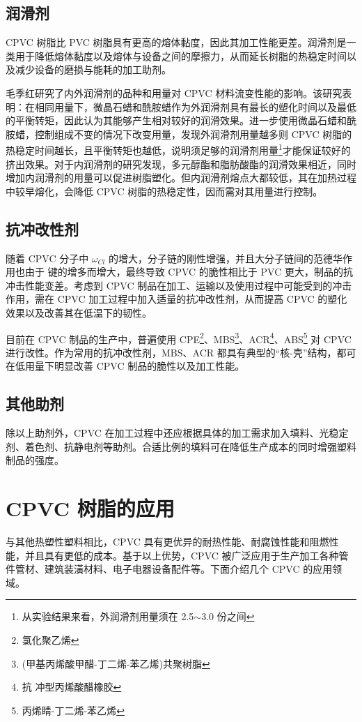 \subsection{润滑剂}
CPVC 树脂比 PVC 树脂具有更高的熔体黏度，因此其加工性能更差。润滑剂是一类用于降低熔体黏度以及熔体与设备之间的摩擦力，从而延长树脂的热稳定时间以及减少设备的磨损与能耗的加工助剂。\par
毛季红\cite{2}研究了内外润滑剂的品种和用量对 CPVC 材料流变性能的影响。该研究表明：在相同用量下，微晶石蜡和酰胺蜡作为外润滑剂具有最长的塑化时间以及最低的平衡转矩，因此认为其能够产生相对较好的润滑效果。进一步使用微晶石蜡和酰胺蜡，控制组成不变的情况下改变用量，发现外润滑剂用量越多则 CPVC 树脂的热稳定时间越长，且平衡转矩也越低，说明须足够的润滑剂用量\footnote{从实验结果来看，外润滑剂用量须在 2.5$\sim$3.0 份之间}才能保证较好的挤出效果。对于内润滑剂的研究发现，多元醇酯和脂肪酸酯的润滑效果相近，同时增加内润滑剂的用量可以促进树脂塑化。但内润滑剂熔点大都较低，其在加热过程中较早熔化，会降低 CPVC 树脂的热稳定性，因而需对其用量进行控制。

\subsection{抗冲改性剂}
随着 CPVC 分子中 $\omega_{Cl}$ 的增大，分子链的刚性增强，并且大分子链间的范德华作用也由于  键的增多而增大，最终导致 CPVC 的脆性相比于 PVC 更大，制品的抗冲击性能变差。考虑到 CPVC 制品在加工、运输以及使用过程中可能受到的冲击作用，需在 CPVC 加工过程中加入适量的抗冲改性剂，从而提高 CPVC 的塑化效果以及改善其在低温下的韧性。\par
目前在 CPVC 制品的生产中，普遍使用 CPE\footnote{氯化聚乙烯}、MBS\footnote{(甲基丙烯酸甲醋-丁二烯-苯乙烯)共聚树脂}、ACR\footnote{抗 冲型丙烯酸醋橡胶}、ABS\footnote{丙烯睛-丁二烯-苯乙烯} 对 CPVC 进行改性。作为常用的抗冲改性剂，MBS、ACR 都具有典型的“核-壳”结构，都可在低用量下明显改善 CPVC 制品的脆性以及加工性能\cite{24}。

\subsection{其他助剂}
除以上助剂外，CPVC 在加工过程中还应根据具体的加工需求加入填料、光稳定剂、着色剂、抗静电剂等助剂。合适比例的填料可在降低生产成本的同时增强塑料制品的强度。


\section{CPVC 树脂的应用}
与其他热塑性塑料相比，CPVC 具有更优异的耐热性能、耐腐蚀性能和阻燃性能，并且具有更低的成本。基于以上优势，CPVC 被广泛应用于生产加工各种管件管材、建筑装潢材料、电子电器设备配件等\cite{5}。下面介绍几个 CPVC 的应用领域。

